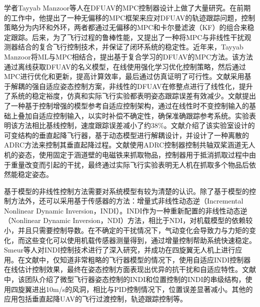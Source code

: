 学者Tayyab Manzoor等人在DFUAV的MPC控制器设计上做了大量研究。在前期的工作中，他提出了一种无偏移的MPC框架来应对DFUAV的轨迹跟踪问题\cite{manzoorTrajectoryTrackingControl2020}，控制策略分为内环和外环，两者都通过无偏移的MPC和卡尔曼滤波（KF）的组合来稳定跟踪。后来，为了飞行过程的鲁棒性能，又提出了一种将MPC与非线性干扰观测器结合的复合飞行控制技术\cite{manzoorMPCBasedCompound2020,manzoorCompositeObserverbasedRobust2023}，并保证了闭环系统的稳定性。近年来，Tayyab Manzoor将ML与MPC相结合，提出基于复合学习的DFUAV的MPC方法\cite{manzoorModelPredictiveControl2023,manzoorCompoundLearningBasedModel2024a}。该方法通过离线获取DFUAV的名义模型，在线使用强化学习优化控制策略，然后通过MPC进行优化和更新，提高计算效率，最后通过仿真证明了可行性。文献\parencite{zhaoModellingAttitudeControl2015}采用基于解耦的强自适应姿态控制方案，非线性的DFUAV在修整点进行了线性化，提升了系统的稳定裕度，仿真和实际飞行实验都表明姿态跟踪误差有效减少。文献\parencite{aiRobustAdaptiveControl2025}提出了一种基于控制增强的模型参考自适应控制架构，通过在线性时不变控制输入的基础上叠加自适应控制输入，以实时补偿不确定性，确保准确跟踪参考系统。实验表明该方法相比基线控制，速度跟踪误差减小了约38\%。文献\parencite{wenResearchVerticalTakeoff2021}介绍了该实验室设计的可变结构的垂直起降飞行器，基于动态模型进行解耦设计，并设计了一种离散的ADRC方法来控制其垂直起降过程。文献\parencite{yinDuctedFanUAV2024}使用ADRC控制器控制共轴双桨涵道无人机的姿态，使用固定于涵道壁的电磁铁来抓取物品，控制器用于抵消抓取过程中由于重量改变而引起的干扰，最终通过实际飞行实验表明无人机在抓取多个物品后依然能稳定姿态。

基于模型的非线性控制方法需要对系统模型有较为清楚的认识。除了基于模型的控制方法外，还可以采用基于传感器的方法：增量式非线性动态逆（Incremental Nonlinear Dynamic Inversion，INDI）。INDI作为一种重新配置的非线性动态逆（Nonlinear Dynamic Inversion，NDI）方法\cite{baconReconfigurableNDIController2001b,DesignFlightTesting}，相比于NDI，对机载模型的依赖较小，并且只需要控制导数。在不确定的干扰情况下，气动变化会导致力与力矩的变化，而这些变化可以使用机载传感器测量得到，通过增量控制帮助系统快速稳定。Smeur等人对INDI控制技术进行了深入研究\cite{smeurAdaptiveIncrementalNonlinear2015,smeurCascadedIncrementalNonlinear2018b,steffensenNonlinearDynamicInversion2023}，并成功在四旋翼无人机上进行应用。在文献\parencite{smeurAdaptiveIncrementalNonlinear2015}中，仅知道非常粗略的飞行器模型的情况下，使用自适应INDI控制器在线估计控制效果，最终在姿态控制方面表现出优异的抗干扰和自适应特性。文献\parencite{smeurCascadedIncrementalNonlinear2018b}中，该团队介绍了微型飞行器姿态控制的INDI和位置控制的INDI的串级结构，使用四旋翼进出10m/s的风洞，相比与PID控制情况下，位置误差显著减小。其他的应用包括垂直起降UAV的飞行过渡控制\cite{chengCorridorbasedFlightMode2023}，轨迹跟踪控制\cite{taherinezhadEnhancedIncrementalNonlinear2023a}等。

